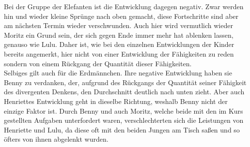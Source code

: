 Bei der Gruppe der Elefanten ist die Entwicklung dagegen negativ. Zwar werden hin und wieder kleine Sprünge nach oben gemacht, diese Fortschritte sind aber am nächsten Termin wieder verschwunden. Auch hier wird vermutlich wieder Moritz ein Grund sein, der sich gegen Ende immer mehr hat ablenken lassen, genauso wie Lulu. Daher ist, wie bei den einzelnen Entwicklungen der Kinder bereits angemerkt, hier nicht von einer Entwicklung der Fähigkeiten zu reden sondern von einem Rückgang der Quantität dieser Fähigkeiten.\\
Selbiges gilt auch für die Erdmännchen. Ihre negative Entwicklung haben sie Benny zu verdanken, der, aufgrund des Rückgangs der Quantität seiner Fähigkeit des divergenten Denkens, den Durchschnitt deutlich nach unten zieht. Aber auch Henriettes Entwicklung geht in dieselbe Richtung, weshalb Benny nicht der einzige Faktor ist. Durch Benny und auch Moritz, welche beide mit den im Kurs gestellten Aufgaben unterfordert waren, verschlechterten sich die Leistungen von Henriette und Lulu, da diese oft mit den beiden Jungen am Tisch saßen und so öfters von ihnen abgelenkt wurden. 
